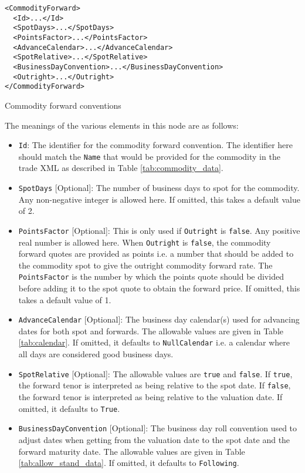 \begin{listing}[H]
\begin{verbatim}
<CommodityForward>
  <Id>...</Id>
  <SpotDays>...</SpotDays>
  <PointsFactor>...</PointsFactor>
  <AdvanceCalendar>...</AdvanceCalendar>
  <SpotRelative>...</SpotRelative>
  <BusinessDayConvention>...</BusinessDayConvention>
  <Outright>...</Outright>
</CommodityForward>
\end{verbatim}
\caption{Commodity forward conventions}
\label{lst:commodity_forward_conventions}
\end{listing}

The meanings of the various elements in this node are as follows:
\begin{itemize}
\item \lstinline!Id!: The identifier for the commodity forward convention. The identifier here should match the \lstinline!Name! that would be provided for the commodity in the trade XML as described in Table \ref{tab:commodity_data}.
\item \lstinline!SpotDays! [Optional]: The number of business days to spot for the commodity. Any non-negative integer is allowed here. If omitted, this takes a default value of 2.
\item \lstinline!PointsFactor! [Optional]: This is only used if \lstinline!Outright! is \lstinline!false!. Any positive real number is allowed here. When \lstinline!Outright! is \lstinline!false!, the commodity forward quotes are provided as points i.e. a number that should be added to the commodity spot to give the outright commodity forward rate. The \lstinline!PointsFactor! is the number by which the points quote should be divided before adding it to the spot quote to obtain the forward price. If omitted, this takes a default value of 1.
\item \lstinline!AdvanceCalendar! [Optional]: The business day calendar(s) used for advancing dates for both spot and forwards. The allowable values are given in Table \ref{tab:calendar}. If omitted, it defaults to \lstinline!NullCalendar! i.e. a calendar where all days are considered good business days.
\item \lstinline!SpotRelative! [Optional]: The allowable values are \lstinline!true! and \lstinline!false!. If \lstinline!true!, the forward tenor is interpreted as being relative to the spot date. If \lstinline!false!, the forward tenor is interpreted as being relative to the valuation date. If omitted, it defaults to \lstinline!True!.
\item \lstinline!BusinessDayConvention! [Optional]: The business day roll convention used to adjust dates when getting from the valuation date to the spot date and the forward maturity date. The allowable values are given in Table \ref{tab:allow_stand_data}. If omitted, it defaults to \lstinline!Following!.

\end{itemize}
